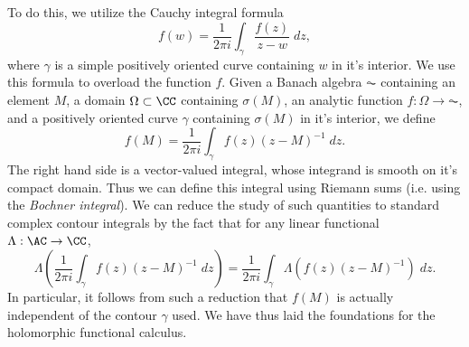 To do this, we utilize the Cauchy integral formula
%
\[ f(w) = \frac{1}{2\pi i} \int_\gamma \frac{f(z)}{z - w} \; dz, \]
%
where $\gamma$ is a simple positively oriented curve containing $w$ in it's interior. We use this formula to overload the function $f$. Given a Banach algebra $\AC$ containing an element $M$, a domain $\Omega \subset \CC$ containing $\sigma(M)$, an analytic function $f: \Omega \to \AC$, and a positively oriented curve $\gamma$ containing $\sigma(M)$ in it's interior, we define
%
\[ f(M) = \frac{1}{2 \pi i} \int_\gamma f(z) (z - M)^{-1}\; dz. \]
%
The right hand side is a vector-valued integral, whose integrand is smooth on it's compact domain. Thus we can define this integral using Riemann sums (i.e. using the \emph{Bochner integral}). We can reduce the study of such quantities to standard complex contour integrals by the fact that for any linear functional $\Lambda: \AC \to \CC$,
%
\[ \Lambda \left( \frac{1}{2 \pi i} \int_\gamma f(z) (z - M)^{-1}\; dz \right) = \frac{1}{2 \pi i} \int_\gamma \Lambda \left( f(z) (z - M)^{-1} \right)\; dz. \]
%
In particular, it follows from such a reduction that $f(M)$ is actually independent of the contour $\gamma$ used. We have thus laid the foundations for the holomorphic functional calculus.

